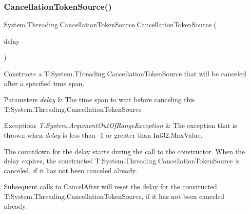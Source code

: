 \subsubsection{\texorpdfstring{Cancellation\+Token\+Source()}{CancellationTokenSource()}\hspace{0.1cm}{\footnotesize\ttfamily [2/3]}}
{\footnotesize\ttfamily System.\+Threading.\+Cancellation\+Token\+Source.\+Cancellation\+Token\+Source (\begin{DoxyParamCaption}\item[{Time\+Span}]{delay }\end{DoxyParamCaption})\hspace{0.3cm}{\ttfamily [inline]}}



Constructs a T\+:\+System.\+Threading.\+Cancellation\+Token\+Source that will be canceled after a specified time span. 


\begin{DoxyParams}{Parameters}
{\em delay} & The time span to wait before canceling this T\+:\+System.\+Threading.\+Cancellation\+Token\+Source\\
\hline
\end{DoxyParams}

\begin{DoxyExceptions}{Exceptions}
{\em T\+:\+System.\+Argument\+Out\+Of\+Range\+Exception} & The exception that is thrown when {\itshape delay}  is less than -\/1 or greater than Int32.\+Max\+Value. \\
\hline
\end{DoxyExceptions}


The countdown for the delay starts during the call to the constructor. When the delay expires, the constructed T\+:\+System.\+Threading.\+Cancellation\+Token\+Source is canceled, if it has not been canceled already. 

Subsequent calls to Cancel\+After will reset the delay for the constructed T\+:\+System.\+Threading.\+Cancellation\+Token\+Source, if it has not been canceled already. \mbox{\label{class_system_1_1_threading_1_1_cancellation_token_source_ae91e609bb47f8bec909153d95d0d2722}} 
